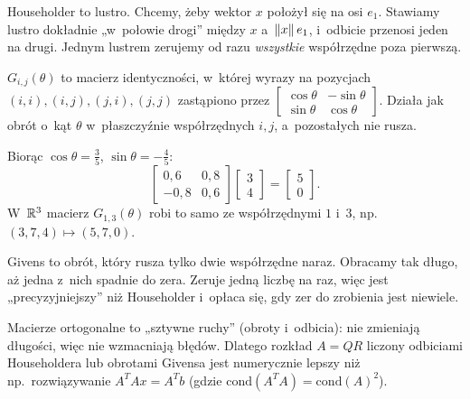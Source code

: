 \documentclass[11pt]{article}
\begin{document}
\begin{poludzku}
Householder to lustro. Chcemy, żeby wektor $x$ położył się na osi $e_1$.
Stawiamy lustro dokładnie „w~połowie drogi” między $x$ a~$\left\lVert x \right\rVert e_1$,
i~odbicie przenosi jeden na drugi. Jednym lustrem zerujemy od razu
\emph{wszystkie} współrzędne poza pierwszą.
\end{poludzku}

\begin{definicja}
$G_{i,j}(\theta)$ to macierz identyczności, w~której wyrazy na pozycjach
$(i,i),(i,j),(j,i),(j,j)$ zastąpiono przez
$\left[\begin{smallmatrix}\cos\theta&-\sin\theta\\\sin\theta&\cos\theta
\end{smallmatrix}\right]$. Działa jak obrót o~kąt $\theta$ w~płaszczyźnie
współrzędnych $i,j$, a~pozostałych nie rusza.
\end{definicja}

\begin{przyklad}
Biorąc $\cos\theta=\tfrac35$, $\sin\theta=-\tfrac45$:
\[
\begin{bmatrix}0{,}6&0{,}8\\-0{,}8&0{,}6\end{bmatrix}
\begin{bmatrix}3\\4\end{bmatrix}=\begin{bmatrix}5\\0\end{bmatrix}.
\]
W~$\mathbb{R}^3$ macierz $G_{1,3}(\theta)$ robi to samo ze współrzędnymi
$1$ i~$3$, np.\ $(3,7,4)\mapsto(5,7,0)$.
\end{przyklad}

\begin{poludzku}
Givens to obrót, który rusza tylko dwie współrzędne naraz. Obracamy tak
długo, aż jedna z~nich spadnie do zera. Zeruje jedną liczbę na raz,
więc jest „precyzyjniejszy” niż Householder i~opłaca się, gdy zer do
zrobienia jest niewiele.
\end{poludzku}

\begin{intuicja}
Macierze ortogonalne to „sztywne ruchy” (obroty i~odbicia): nie zmieniają
długości, więc nie wzmacniają błędów. Dlatego rozkład $A=QR$ liczony
odbiciami Householdera lub obrotami Givensa jest numerycznie lepszy niż
np.\ rozwiązywanie $A^TAx=A^Tb$ (gdzie $\mathrm{cond}(A^TA)=
\mathrm{cond}(A)^2$).
\end{intuicja}
\end{document}
